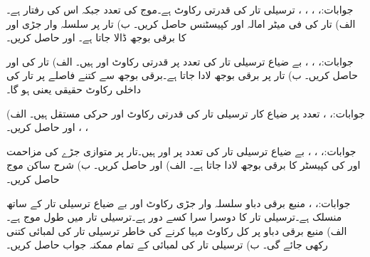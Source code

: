جوابات:، ، ، ، 
ترسیلی تار کی قدرتی رکاوٹ  ہے۔موج کی تعدد  جبکہ اس کی رفتار  ہے۔ الف) تار کی فی میٹر امالہ اور کپیسٹنس حاصل کریں۔ ب) تار پر سلسلہ وار جڑی  اور  کا برقی بوجھ ڈالا جاتا ہے۔  اور  حاصل کریں۔

جوابات:، ، ، 
بے ضیاع ترسیلی تار کی  تعدد پر قدرتی رکاوٹ  اور  ہیں۔ الف) تار کی  اور  حاصل کریں۔ ب) تار پر  برقی بوجھ لادا جاتا ہے۔برقی بوجھ سے کتنے فاصلے پر تار کی داخلی رکاوٹ  حقیقی  یعنی  ہو گا۔

جوابات:، ،  
تعدد  پر ضیاع کار ترسیلی تار کی قدرتی رکاوٹ   اور حرکی مستقل  ہیں۔ الف) ، ،  اور  حاصل کریں۔

جوابات:، ، ، 
بے ضیاع ترسیلی تار کی  تعدد پر  اور  ہیں۔تار پر متوازی جڑے  کی مزاحمت اور  کی کپیسٹر کا برقی بوجھ لادا جاتا ہے۔ الف)  اور  حاصل کریں۔ ب) شرح ساکن موج حاصل کریں۔

جوابات:، ، 
منبع برقی دباو سلسلہ وار جڑی رکاوٹ  اور بے ضیاع ترسیلی تار کے ساتھ منسلک ہے۔ترسیلی تار کا دوسرا سرا کسے دور ہے۔ترسیلی تار میں طول موج  ہے۔ الف) منبع برقی دباو پر کل  رکاوٹ مہیا کرنے کی خاطر ترسیلی تار کی لمبائی کتنی رکھی جائے گی۔ ب) ترسیلی تار کی لمبائی کے  تمام ممکنہ جواب حاصل کریں۔

